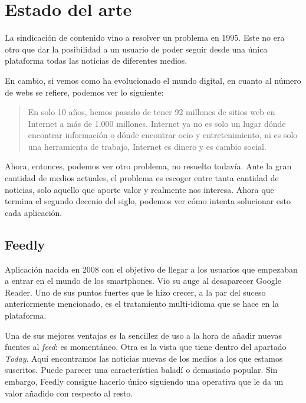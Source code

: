 \section{Estado del arte}\label{sec:arte}

La sindicación de contenido vino a resolver un problema en 1995. Este no era otro que dar la posibilidad a un usuario de poder seguir desde una única plataforma todas las noticias de diferentes medios.

En cambio, si vemos como ha evolucionado el mundo digital, en cuanto al número de webs se refiere, podemos ver lo siguiente:

\begin{quote}
	\small En solo 10 años, hemos pasado de tener 92 millones de sitios web en Internet a más de 1.000 millones. Internet ya no es solo un lugar dónde encontrar información o dónde encontrar ocio y entretenimiento, ni es solo una herramienta de trabajo, Internet es dinero y es cambio social.
	\begin{flushright}
	\end{flushright}
\end{quote}

Ahora, entonces, podemos ver otro problema, no resuelto todavía. Ante la gran cantidad de medios actuales, el problema es escoger entre tanta cantidad de noticias, solo aquello que aporte valor y realmente nos interesa. Ahora que termina el segundo decenio del siglo, podemos ver cómo intenta solucionar esto cada aplicación.

\subsection{Feedly}

Aplicación nacida en 2008 con el objetivo de llegar a los usuarios que empezaban a entrar en el mundo de los smartphones. Vio su auge al desaparecer Google Reader. Uno de sus puntos fuertes que le hizo crecer, a la par del suceso anteriormente mencionado, es el tratamiento multi-idioma que se hace en la plataforma.


Una de sus mejores ventajas es la sencillez de uso a la hora de añadir nuevas fuentes al \textit{feed}: es momentáneo. Otra es la vista que tiene dentro del apartado \textit{Today}. Aquí encontramos las noticias nuevas de los medios a los que estamos suscritos. Puede parecer una característica baladí o demasiado popular. Sin embargo, Feedly consigue hacerlo único siguiendo una operativa que le da un valor añadido con respecto al resto.

